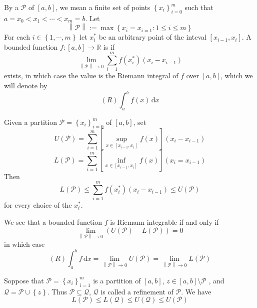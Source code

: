 \documentclass[../main.tex]{subfiles}
\begin{document}
\begin{definition}{}{}
    By a  \(  \mathcal{P}  \) of \(  \left[ a,b \right]   \), we mean a finite set of points \(  \left\{ x_{i} \right\}_{i= 0}^{m}  \) such that \(  a= x_0< x_1< \cdots < x_{m}= b  \).  Let \[
    \left\| \mathcal{P} \right\|:=  \max \left\{ x_{i}=x_{i=1}:1\le i\le m \right\}
    \]    For each \(  i\in \left\{  1,\cdots,m  \right\}  \) let \(  x_{i}^{*}  \) be an arbitrary point of the inteval \(  \left[ x_{i-1},x_{i} \right]   \). A bounded function \(  f:\left[ a,b \right]\to \mathbb{R}    \) is  if \[
    \lim_{\left\| \mathcal{P} \right\|\to 0} \sum _{i = 1}^{m}f\left( x_{i}^{*} \right)\left( x_{i}-x_{i-1} \right)  
    \]    exists, in which case the value is the Riemann integral of \(  f  \) over \(  \left[ a,b \right]   \), which we will denote by \[
    \left( R \right)\int_{a}^{b}f\left( x \right)\,\mathrm{d} x  
    \]  
\end{definition}

\begin{lemma}{}{}
      Given a partition \(  \mathcal{P}= \left\{ x_{i} \right\}_{i= 0}^{m}  \) of \(  \left[ a,b \right]   \), set \[
    U\left( \mathcal{P} \right)= \sum _{i= 1}^{m}\left[ \sup _{x\in \left[ x_{i-1},x_{i} \right] }f\left( x \right)  \right]\left( x_{i}-x_{i-1} \right)   
    \] \[
    L\left( \mathcal{P} \right) = \sum _{i= 1}^{m}\left[ \inf _{x\in \left[ x_{i-1},x_{i} \right] }f\left( x \right)  \right]\left( x_{i}=x_{i-1} \right)  
    \]Then \[
    L\left( \mathcal{P} \right)\le \sum _{i= 1}^{m}f\left( x_{i}^{*} \right)\left( x_{i}-x_{i-1} \right)\le U\left( \mathcal{P} \right)    
    \]  for every choice of the \(  x_{i}^{*}  \). 

    We see that a bounded function \(  f  \) is Riemann integrable if and only if \[
    \lim_{\left\| \mathcal{P} \right\|\to 0}\left( U\left( \mathcal{P} \right)-L\left( \mathcal{P} \right)   \right)= 0 
    \] in which case \[
    \left( R \right) \int_{a}^{b}f\,\mathrm{d} x= \lim_{\left\| \mathcal{P} \right\|\to 0} U\left( \mathcal{P} \right)= \lim_{\left\| \mathcal{P} \right\|\to 0}L\left( \mathcal{P} \right)   
    \]
\end{lemma}

\begin{lemma}{}{}
    Soppose that \(  \mathcal{P}= \left\{ x_{i} \right\}_{i= 1}^{m}  \) is a partition of \(  \left[ a,b \right]   \), \(  z\in [a,b]\setminus \mathcal{P}  \) , and \(  \mathcal{Q}= \mathcal{P}\cup \left\{ z \right\}  \). Thus \(  \mathcal{P}\subseteq \mathcal{Q}  \), \(  \mathcal{Q}  \) is called a refinement of \(  \mathcal{P}  \). We have \[
    L\left( \mathcal{P} \right)\le L\left( \mathcal{Q} \right)\le U\left( \mathcal{Q} \right)\le U\left( \mathcal{P} \right)    
    \]       
\end{lemma}
\end{document}
